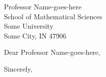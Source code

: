 \documentclass[11pt,a4paper]{letter}
\begin{document}
\begin{letter}
{Professor Name-goes-here\\
School of Mathematical Sciences\\
Some University\\
Some City, IN 47906}

\opening{Dear Professor Name-goes-here,}
\thispagestyle{fancy}

\lipsum[1-10]%

\closing{Sincerely,}
\bigskip


\end{letter}
\end{document}

